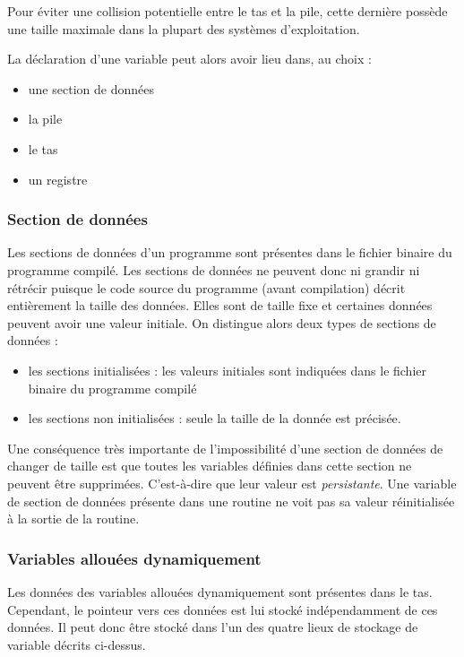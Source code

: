 \documentclass[../../../main.tex]{subfiles}
\begin{document}
\begin{minipage}{\textwidth}
	\begin{center}
		
	\end{center}
\end{minipage}

Pour éviter une collision potentielle entre le tas et la pile, cette dernière possède une taille maximale dans la plupart des systèmes d'exploitation.

La déclaration d'une variable peut alors avoir lieu dans, au choix :
\begin{itemize}
	\item une section de données
	\item la pile
	\item le tas
	\item un registre
\end{itemize}
\subsubsection{Section de données}
Les sections de données d'un programme sont présentes dans le fichier binaire du programme compilé. Les sections de données ne peuvent donc ni grandir ni rétrécir puisque le code source du programme (avant compilation) décrit entièrement la taille des données. Elles sont de taille fixe et certaines données peuvent avoir une valeur initiale. On distingue alors deux types de sections de données :
\begin{itemize}
	\item les sections initialisées : les valeurs initiales sont indiquées dans le fichier binaire du programme compilé
	\item les sections non initialisées : seule la taille de la donnée est précisée.
\end{itemize}
Une conséquence très importante de l'impossibilité d'une section de données de changer de taille est que toutes les variables définies dans cette section ne peuvent être supprimées. C'est-à-dire que leur valeur est \textit{persistante}. Une variable de section de données présente dans une routine ne voit pas sa valeur réinitialisée à la sortie de la routine.
\subsubsection{Variables allouées dynamiquement}
Les données des variables allouées dynamiquement sont présentes dans le tas. Cependant, le pointeur vers ces données est lui stocké indépendamment de ces données. Il peut donc être stocké dans l'un des quatre lieux de stockage de variable décrits ci-dessus.
\end{document}

